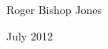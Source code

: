 Roger Bishop Jones

July 2012

\mainmatter

\renewcommand{\aref}{Volume \Roman{chapter} Book \Roman{section} Part \arabic{subsection}}



\backmatter

%
%




\renewcommand{\aref}{}
\renewcommand{\volumename}{}
\renewcommand{\chaptermark}[1]{}
\renewcommand{\sectionmark}[1]{}

\printindex

\vfil



